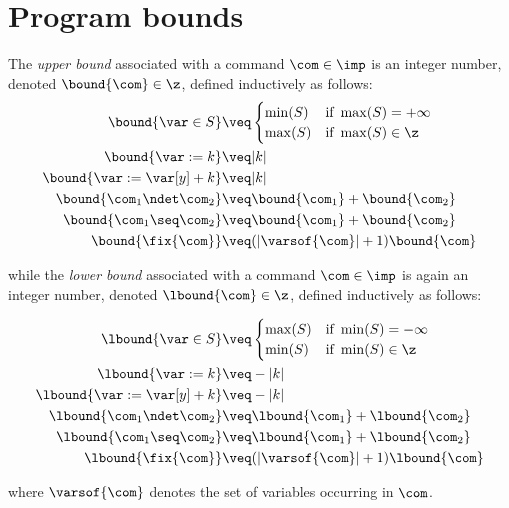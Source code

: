 \section{Program bounds}
\label{sec:bounds}

\begin{definition}
  \label{de:bound}
  The \emph{upper bound} associated with a command \(\com\in \imp\) is
  an integer number, denoted \(\bound{\com}\in \z\), defined
  inductively as follows:
  \begin{align*}
    \bound{\var \in S}  
    & \veq \begin{cases}
      \min(S) & \text{if } \max(S)=+\infty\\
      \max(S) & \text{if } \max(S)\in\z
    \end{cases}
    \\
    \bound{\var := k} 
    & \veq | k |\\
    \bound{\var := \var[y] + k}
    & \veq | k |\\
    \bound{\com_1 \ndet \com_2}
    & \veq \bound{\com_1} + \bound{\com_2}\\
    \bound{\com_1 \seq \com_2}
    & \veq \bound{\com_1} + \bound{\com_2}\\
    \bound{\fix{\com}}
    & \veq (|\varsof{\com}|+1) \bound{\com} \\ 
  \end{align*}

  while the \emph{lower bound} associated with a command
  \(\com\in \imp\) is again an integer number, denoted
  \(\lbound{\com}\in \z\), defined inductively as follows:

  \begin{align*}
    \lbound{\var \in S}  
    & \veq \begin{cases}
      \max(S) & \text{if } \min(S)=-\infty\\
      \min(S) & \text{if } \min(S)\in \z
    \end{cases}
    \\
    \lbound{\var := k} 
    & \veq - | k |\\
    \lbound{\var := \var[y] + k}
    & \veq - | k |\\
    \lbound{\com_1 \ndet \com_2}
    & \veq \lbound{\com_1} + \lbound{\com_2}\\
    \lbound{\com_1 \seq \com_2}
    & \veq \lbound{\com_1} + \lbound{\com_2}\\
    \lbound{\fix{\com}}
    & \veq (|\varsof{\com}|+1) \lbound{\com} \\ 
  \end{align*}

  where \(\varsof{\com}\) denotes the set of variables occurring in 
  \(\com\).
\end{definition}


